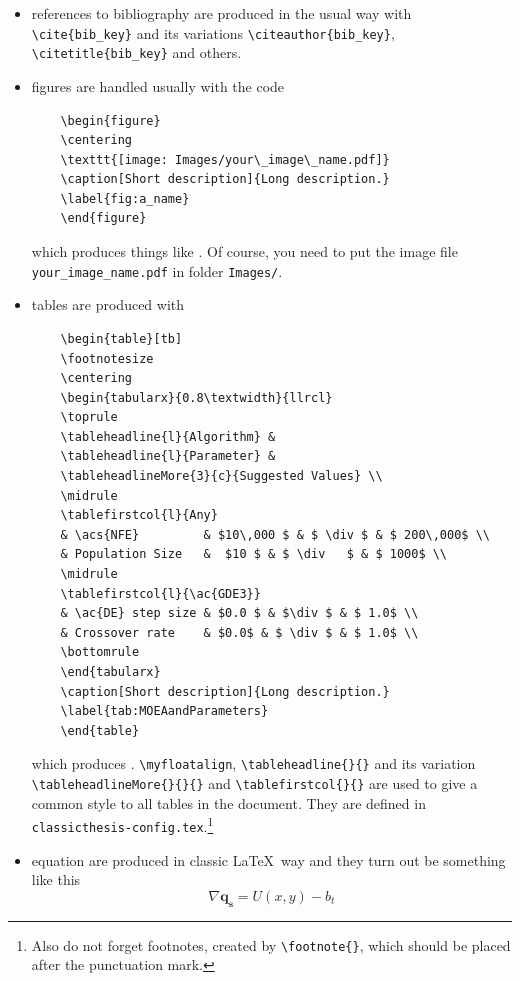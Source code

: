 \begin{itemize}
	\item references to bibliography are produced in the usual way with \verb!\cite{bib_key}! \cite{bringhurst:2002} and its variations \verb!\citeauthor{bib_key}!, \verb!\citetitle{bib_key}! and others.

	\item figures are handled usually with the code
	\begin{verbatim}
	\begin{figure}
	\centering
	\texttt{[image: Images/your\_image\_name.pdf]} 
	\caption[Short description]{Long description.}
	\label{fig:a_name}
	\end{figure}
	\end{verbatim}
	which produces things like . Of course, you need to put the image file \verb!your_image_name.pdf! in folder \verb!Images/!.

	\item tables are produced with
	\begin{verbatim}
	\begin{table}[tb]
	\footnotesize
	\centering
	\begin{tabularx}{0.8\textwidth}{llrcl}
	\toprule
	\tableheadline{l}{Algorithm} &
	\tableheadline{l}{Parameter} &
	\tableheadlineMore{3}{c}{Suggested Values} \\
	\midrule
	\tablefirstcol{l}{Any}
	& \acs{NFE} 		& $10\,000 $ & $ \div $ & $ 200\,000$ \\
	& Population Size 	&  $10 $ & $ \div 	$ & $ 1000$ \\
	\midrule
	\tablefirstcol{l}{\ac{GDE3}}
	& \ac{DE} step size & $0.0 $ & $\div $ & $ 1.0$ \\
	& Crossover rate 	& $0.0$ & $ \div $ & $ 1.0$ \\
	\bottomrule
	\end{tabularx}
	\caption[Short description]{Long description.}
	\label{tab:MOEAandParameters}
	\end{table}
	\end{verbatim}
	which produces .
\verb!\myfloatalign!, \verb!\tableheadline{}{}! and its variation \verb!\tableheadlineMore{}{}{}! and \verb!\tablefirstcol{}{}! are used to give a common style to all tables in the document.
They are defined in \verb!classicthesis-config.tex!.\footnote{Also do not forget footnotes, created by \texttt{\textbackslash footnote\{\}}, which should be placed after the punctuation mark.}

	\item equation are produced in classic \LaTeX\ way and they turn out be something like this
	\begin{equation}
	\nabla \mathbf{q_s} = U(x,y) - b_t
	\label{eq:massConservation}
	\end{equation}

\end{itemize}

